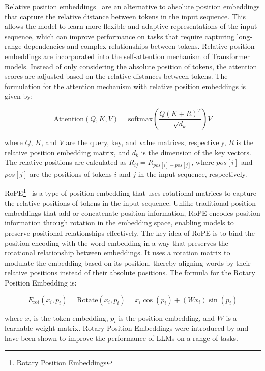 Relative position embeddings~\cite{shaw2018self} are an alternative to absolute position embeddings that capture the relative distance between tokens in the input sequence.
This allows the model to learn more flexible and adaptive representations of the input sequence, which can improve performance on tasks that require capturing long-range dependencies and complex relationships between tokens.
Relative position embeddings are incorporated into the self-attention mechanism of Transformer models.
Instead of only considering the absolute position of tokens, the attention scores are adjusted based on the relative distances between tokens.
The formulation for the attention mechanism with relative position embeddings is given by:

\begin{equation}
	\text{Attention}(Q, K, V) = \text{softmax}\left(\frac{Q(K+R)^T}{\sqrt{d_k}}\right)V
	\label{eq:relative-position-embeddings}
\end{equation}

\noindent where \(Q\), \(K\), and \(V\) are the query, key, and value matrices, respectively, \(R\) is the relative position embedding matrix, and \(d_k\) is the dimension of the key vectors.
The relative positions are calculated as \(R_{ij} = R_{pos[i]-pos[j]}\), where \(pos[i]\) and \(pos[j]\) are the positions of tokens \(i\) and \(j\) in the input sequence, respectively.

RoPE\footnote{Rotary Position Embeddings}~\cite{su2021roformer} is a type of position embedding that uses rotational matrices to capture the relative positions of tokens in the input sequence.
Unlike traditional position embeddings that add or concatenate position information, RoPE encodes position information through rotation in the embedding space, enabling models to preserve positional relationships effectively.
The key idea of RoPE is to bind the position encoding with the word embedding in a way that preserves the rotational relationship between embeddings.
It uses a rotation matrix to modulate the embedding based on its position, thereby aligning words by their relative positions instead of their absolute positions.
The formula for the Rotary Position Embedding is:

\begin{equation}
	E_{\text{rot}}(x_i,p_i) = \text{Rotate}(x_i,p_i) = x_i\cos(p_i) + (Wx_i)\sin(p_i)
	\label{eq:rope}
\end{equation}

\noindent where \(x_i\) is the token embedding, \(p_i\) is the position embedding, and \(W\) is a learnable weight matrix.
Rotary Position Embeddings were introduced by \textcite{su2021roformer} and have been shown to improve the performance of LLMs on a range of tasks.

